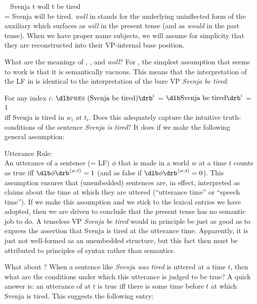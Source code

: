 \ex~ \lb[TP] Svenja \lb[T$'$] \pres \lb[MP] t \lb[M$'$] woll \lb[VP] t \lb[V$'$]
be tired \rb \rb \rb \rb \rb \rb\\
= Svenja will be tired. \xe
%
%
\emph{woll} in \Last stands for the underlying uninflected form of the auxiliary
which surfaces as \emph{will} in the present tense (and as \emph{would} in the
past tense). When we have proper name subjects, we will assume for simplicity
that they are reconstructed into their VP-internal base position.

What are the meanings of \pres, \past, and \emph{woll}? For \pres, the simplest
assumption that seems to work is that it is semantically vacuous. This means
that the interpretation of the LF in  is identical to the
interpretation of the bare VP \emph{Svenja be tired}:

\ex For any index $i$: $\svt{\pres (Svenja be tired)}^i$ =
$\svt{Svenja be tired}^{i}$ = 1\\ iff Svenja is tired in $w_{i}$ at $t_{i}$.\xe
%
Does this adequately capture the intuitive truth-conditions of the sentence
\emph{Svenja is tired}? It does if we make the following general
assumption:

\ex Utterance Rule:\\
An utterance of a sentence (= LF) $\phi$ that is made in a world $w$ at a time
$t$ counts as true iff $\sv{\phi}^{\pair{w,t}} = 1$ (and as false if
$\sv{\phi}^{\pair{w,t}} = 0$).
\xe
%
This assumption ensures that (unembedded) sentences are, in effect, interpreted
as claims about the time at which they are uttered (``utterance time'' or
``speech time''). If we make this assumption and we stick to the lexical entries
we have adopted, then we are driven to conclude that the present tense has no
semantic job to do. A tenseless VP \emph{Svenja be tired} would in principle be
just as good as  to express the assertion that Svenja is tired
at the utterance time. Apparently, it is just not well-formed as an unembedded
structure, but this fact then must be attributed to principles of syntax rather
than semantics.

What about \past? When a sentence like  \emph{Svenja was
  tired} is uttered at a time $t$, then what are the conditions under which this
utterance is judged to be true? A quick answer is: an utterance of
 at $t$ is true iff there is some time before $t$ at which
Svenja is tired. This suggests the following entry:

